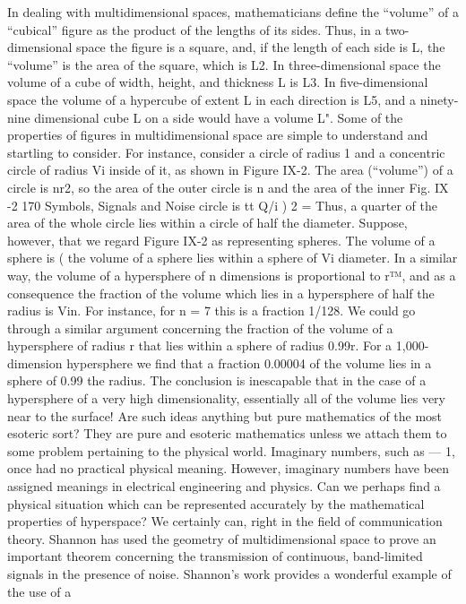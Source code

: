 {{{{{{{{{{In dealing with multidimensional spaces, mathematicians define
the “volume” of a “cubical” figure as the product of the lengths
of its sides. Thus, in a two-dimensional space the figure is a square,
and, if the length of each side is L, the “volume” is the area of the
square, which is L2. In three-dimensional space the volume of a
cube of width, height, and thickness L is L3. In five-dimensional
space the volume of a hypercube of extent L in each direction is
L5, and a ninety-nine dimensional cube L on a side would have a
volume L".
Some of the properties of figures in multidimensional space are
simple to understand and startling to consider. For instance, consider
a circle of radius 1 and a concentric circle of radius Vi inside
of it, as shown in Figure IX-2. The area (“volume”) of a circle is
nr2, so the area of the outer circle is n and the area of the inner
Fig. IX -2
170
Symbols, Signals and Noise
circle is tt Q/i ) 2 = Thus, a quarter of the area of the whole
circle lies within a circle of half the diameter.
Suppose, however, that we regard Figure IX-2 as representing
spheres. The volume of a sphere is (%
the volume of a sphere lies within a sphere of Vi diameter. In a
similar way, the volume of a hypersphere of n dimensions is proportional
to r™, and as a consequence the fraction of the volume
which lies in a hypersphere of half the radius is Vin. For instance,
for n = 7 this is a fraction 1/128.
We could go through a similar argument concerning the fraction
of the volume of a hypersphere of radius r that lies within a sphere
of radius 0.99r. For a 1,000-dimension hypersphere we find that a
fraction 0.00004 of the volume lies in a sphere of 0.99 the radius.
The conclusion is inescapable that in the case of a hypersphere of
a very high dimensionality, essentially all of the volume lies very
near to the surface!
Are such ideas anything but pure mathematics of the most
esoteric sort? They are pure and esoteric mathematics unless we
attach them to some problem pertaining to the physical world.
Imaginary numbers, such as \/— 1, once had no practical physical
meaning. However, imaginary numbers have been assigned meanings
in electrical engineering and physics. Can we perhaps find a
physical situation which can be represented accurately by the
mathematical properties of hyperspace? We certainly can, right in
the field of communication theory. Shannon has used the geometry
of multidimensional space to prove an important theorem concerning
the transmission of continuous, band-limited signals in the
presence of noise.
Shannon’s work provides a wonderful example of the use of a
}}}}}}}}}}
